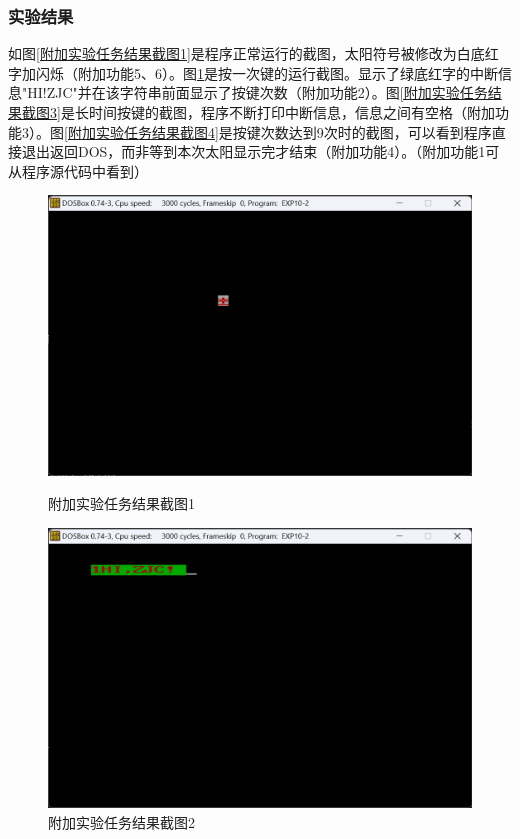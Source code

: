 \documentclass[12pt, a4paper, oneside]{ctexart}
\begin{document}
\subsubsection{实验结果}
如图\ref{附加实验任务结果截图1}是程序正常运行的截图，太阳符号被修改为白底红字加闪烁（附加功能5、6）。图\ref{附加实验任务结果截图2}是按一次键的运行截图。显示了绿底红字的中断信息"HI!ZJC"并在该字符串前面显示了按键次数（附加功能2）。图\ref{附加实验任务结果截图3}是长时间按键的截图，程序不断打印中断信息，信息之间有空格（附加功能3）。图\ref{附加实验任务结果截图4}是按键次数达到9次时的截图，可以看到程序直接退出返回DOS，而非等到本次太阳显示完才结束（附加功能4）。（附加功能1可从程序源代码中看到）
\begin{figure}[H]
    \centering
    \begin{minipage}{0.45\textwidth}
    \centering
    \includegraphics[scale=0.48]{pic/exp10-5.png}
    \caption{附加实验任务结果截图1}
    \label{附加实验任务结果截图1}
    \end{minipage}
    \hspace{0.05\textwidth}
    \begin{minipage}{0.45\textwidth}
    \centering
    \includegraphics[scale=0.48]{pic/exp10-6.png}
    \caption{附加实验任务结果截图2}
    \label{附加实验任务结果截图2}
    \end{minipage}
\end{figure}
\end{document}
